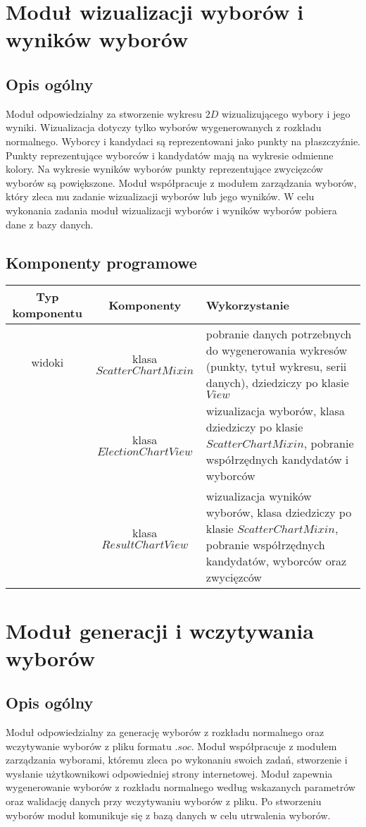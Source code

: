 \documentclass[pdflatex,11pt]{../aghdoc_version2}
\begin{document}
\section{Moduł wizualizacji wyborów i wyników wyborów}
\subsection{Opis ogólny}
Moduł odpowiedzialny za stworzenie wykresu $2D$ wizualizującego wybory i jego wyniki.
Wizualizacja dotyczy tylko wyborów wygenerowanych z rozkładu normalnego. Wyborcy i
kandydaci są reprezentowani jako punkty na płaszczyźnie. Punkty reprezentujące wyborców
i kandydatów mają na wykresie odmienne kolory. Na wykresie wyników wyborów punkty
reprezentujące zwycięzców wyborów są powiększone. Moduł współpracuje z modułem
zarządzania wyborów, który zleca mu zadanie wizualizacji wyborów lub jego wyników. W
celu wykonania zadania moduł wizualizacji wyborów i wyników wyborów pobiera dane z
bazy danych.

\subsection{Komponenty programowe}
\begin{tabular}{|c|c|p{5cm}|}
\hline 
\textbf{Typ komponentu} & \textbf{Komponenty} & \textbf{Wykorzystanie} \\ 
\hline 
widoki & klasa $ScatterChartMixin$ & pobranie danych potrzebnych do
wygenerowania wykresów (punkty, tytuł
wykresu, serii danych), dziedziczy po
klasie $View$ \\ 
\cline{2-3} 
 & klasa $ElectionChartView$ & wizualizacja wyborów, klasa dziedziczy
po klasie $ScatterChartMixin$, pobranie
współrzędnych kandydatów i wyborców \\ 
\cline{2-3} 
 & klasa $ResultChartView$ & wizualizacja wyników wyborów, klasa
dziedziczy po klasie $ScatterChartMixin$,
pobranie współrzędnych kandydatów,
wyborców oraz zwycięzców \\ 
\hline 
\end{tabular} 

\section{Moduł generacji i wczytywania wyborów}
\subsection{Opis ogólny}
Moduł odpowiedzialny za generację wyborów z rozkładu normalnego oraz wczytywanie
wyborów z pliku formatu $.soc$. Moduł współpracuje z modułem zarządzania wyborami,
któremu zleca po wykonaniu swoich zadań, stworzenie i wysłanie użytkownikowi
odpowiedniej strony internetowej. Moduł zapewnia wygenerowanie wyborów z rozkładu normalnego według wskazanych parametrów oraz walidację danych przy wczytywaniu
wyborów z pliku. Po stworzeniu wyborów moduł komunikuje się z bazą danych w celu
utrwalenia wyborów.
\end{document}
